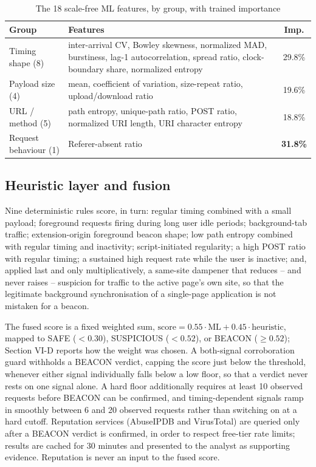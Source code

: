 \documentclass[conference,a4paper]{IEEEtran}
\begin{document}
\begin{table}[t]
\caption{The 18 scale-free ML features, by group, with trained importance}
\label{tab:features}
\centering
\small
\setlength{\tabcolsep}{3pt}
\begin{tabular}{p{}p{}c}
\toprule
\textbf{Group} & \textbf{Features} & \textbf{Imp.} \\
\midrule
Timing shape (8) & inter-arrival CV, Bowley skewness, normalized MAD, burstiness, lag-1 autocorrelation, spread ratio, clock-boundary share, normalized entropy & 29.8\% \\
Payload size (4) & mean, coefficient of variation, size-repeat ratio, upload/download ratio & 19.6\% \\
URL / method (5) & path entropy, unique-path ratio, POST ratio, normalized URI length, URI character entropy & 18.8\% \\
Request behaviour (1) & Referer-absent ratio & \textbf{31.8\%} \\
\bottomrule
\end{tabular}
\end{table}

\subsection{Heuristic layer and fusion}
Nine deterministic rules score, in turn: regular timing combined with a small payload; foreground requests firing during long user idle periods; background-tab traffic; extension-origin foreground beacon shape; low path entropy combined with regular timing and inactivity; script-initiated regularity; a high POST ratio with regular timing; a sustained high request rate while the user is inactive; and, applied last and only multiplicatively, a same-site dampener that reduces -- and never raises -- suspicion for traffic to the active page's own site, so that the legitimate background synchronisation of a single-page application is not mistaken for a beacon.

The fused score is a fixed weighted sum, \(\mathrm{score} = 0.55 \cdot \mathrm{ML} + 0.45 \cdot \mathrm{heuristic}\), mapped to SAFE ($<0.30$), SUSPICIOUS ($<0.52$), or BEACON ($\geq 0.52$); Section VI-D reports how the weight was chosen. A both-signal corroboration guard withholds a BEACON verdict, capping the score just below the threshold, whenever either signal individually falls below a low floor, so that a verdict never rests on one signal alone. A hard floor additionally requires at least 10 observed requests before BEACON can be confirmed, and timing-dependent signals ramp in smoothly between 6 and 20 observed requests rather than switching on at a hard cutoff. Reputation services (AbuseIPDB and VirusTotal) are queried only after a BEACON verdict is confirmed, in order to respect free-tier rate limits; results are cached for 30 minutes and presented to the analyst as supporting evidence. Reputation is never an input to the fused score.
\end{document}
